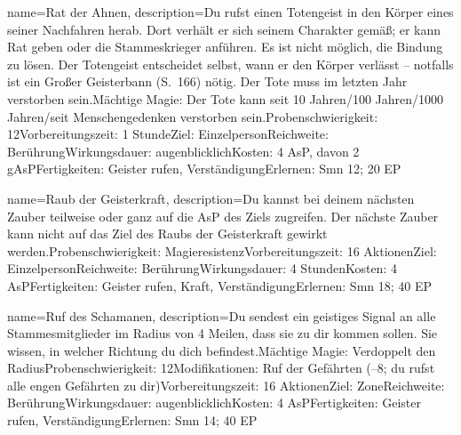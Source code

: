 {
    name={Rat der Ahnen},
    description={Du rufst einen Totengeist in den Körper eines seiner Nachfahren herab. Dort verhält er sich seinem Charakter gemäß; er kann Rat geben oder die Stammeskrieger anführen. Es ist nicht möglich, die Bindung zu lösen. Der Totengeist entscheidet selbst, wann er den Körper verlässt – notfalls ist ein Großer Geisterbann (S. 166) nötig. Der Tote muss im letzten Jahr verstorben sein.\newline Mächtige Magie: Der Tote kann seit 10 Jahren/100 Jahren/1000 Jahren/seit Menschengedenken verstorben sein.\newline Probenschwierigkeit: 12\newline Vorbereitungszeit: 1 Stunde\newline Ziel: Einzelperson\newline Reichweite: Berührung\newline Wirkungsdauer: augenblicklich\newline Kosten: 4 AsP, davon 2 gAsP\newline Fertigkeiten: Geister rufen, Verständigung\newline Erlernen: Smn 12; 20 EP}
}


{
    name={Raub der Geisterkraft},
    description={Du kannst bei deinem nächsten Zauber teilweise oder ganz auf die AsP des Ziels zugreifen. Der nächste Zauber kann nicht auf das Ziel des Raubs der Geisterkraft gewirkt werden.\newline Probenschwierigkeit: Magieresistenz\newline Vorbereitungszeit: 16 Aktionen\newline Ziel: Einzelperson\newline Reichweite: Berührung\newline Wirkungsdauer: 4 Stunden\newline Kosten: 4 AsP\newline Fertigkeiten: Geister rufen, Kraft, Verständigung\newline Erlernen: Smn 18; 40 EP}
}


{
    name={Ruf des Schamanen},
    description={Du sendest ein geistiges Signal an alle Stammesmitglieder im Radius von 4 Meilen, dass sie zu dir kommen sollen. Sie wissen, in welcher Richtung du dich befindest.\newline Mächtige Magie: Verdoppelt den Radius\newline Probenschwierigkeit: 12\newline Modifikationen: Ruf der Gefährten (–8; du rufst alle engen Gefährten zu dir)\newline Vorbereitungszeit: 16 Aktionen\newline Ziel: Zone\newline Reichweite: Berührung\newline Wirkungsdauer: augenblicklich\newline Kosten: 4 AsP\newline Fertigkeiten: Geister rufen, Verständigung\newline Erlernen: Smn 14; 40 EP}
}


